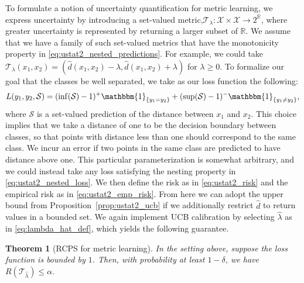 \documentclass[10pt]{article}
\newtheorem{theorem}{Theorem}
\def\R{\mathbb{R}}
\newcommand{\X}{\mathcal{X}}
\newcommand{\T}{\mathcal{T}}
\renewcommand{\S}{\mathcal{S}}
\newcommand{\ind}[1]{\mathbbm{1}_{\left\{#1\right\}}}
\begin{document}
To formulate a notion of uncertainty quantification for metric learning, we express uncertainty by introducing a set-valued metric,$\T_\lambda : \X \times \X \to 2^\R$, where greater uncertainty is represented by returning a larger subset of $\R$. We assume that we have a family of such set-valued metrics that have the monotonicity property in \eqref{eq:ustat2_nested_predictions}.
For example, we could take $\T_\lambda(x_1, x_2) = (\hat{d}(x_1, x_2) - \lambda, \hat{d}(x_1, x_2) + \lambda)$ for $\lambda \ge 0$.
To formalize our goal that the classes be well separated, we take as our loss function the following:
\begin{equation*}
    L(y_1, y_2, \S) = (\inf(\S) - 1)^+ \ind{y_1 = y_2} + (\sup(\S) - 1)^- \ind{y_1 \ne y_2},
\end{equation*}
where $\S$ is a set-valued prediction of the distance between $x_1$ and $x_2$. This choice implies that we take a distance of one to be the decision boundary between classes, so that points with distance less than one should correspond to the same class. We incur an error if two points in the same class are predicted to have distance above one. This particular parameterization is somewhat arbitrary, and we could instead take any loss satisfying the nesting property in \eqref{eq:ustat2_nested_loss}.
We then define the risk as in \eqref{eq:ustat2_risk} and the empirical risk as in \eqref{eq:ustat2_emp_risk}.
From here we can adopt the upper bound from Proposition~\ref{prop:ustat2_ucb} if we additionally restrict $\hat{d}$ to return values in a bounded set. We again implement UCB calibration by selecting $\hat{\lambda}$ as in \eqref{eq:lambda_hat_def}, which yields the following guarantee.
\begin{theorem}[RCPS for metric learning]
\label{thm:metric_learning}
In the setting above, suppose the loss function is bounded by $1$. Then, with probability at least $1-\delta$, we have $R(\T_{\hat{\lambda}}) \le \alpha$.
\end{theorem}
\end{document}
